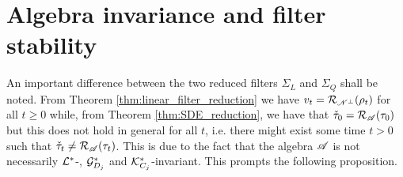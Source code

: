 \documentclass[aihp,12pt]{imsart}
\begin{document}
\section{Algebra invariance and filter stability}

An important difference between the two reduced filters $\Sigma_L$ and $\Sigma_Q$ shall be noted. From Theorem \ref{thm:linear_filter_reduction} we have $v_t = \mathcal{R}_{\mathscr{N}^\perp}(\rho_t)$ for all $t\geq0$ while, from Theorem \ref{thm:SDE_reduction}, we have that $\check{\tau}_0 = \mathcal{R}_{\mathscr{A}}(\tau_0)$ but this does not hold in general for all $t$, i.e. there might exist some time $t>0$ such that $\check{\tau}_t \neq \mathcal{R}_{\mathscr{A}}(\tau_t)$. This is due to the fact that the algebra $\mathscr{A}$ is not necessarily $\mathcal{L}^*$-, $\mathcal{G}_{D_j}^*$ and $\mathcal{K}_{C_j}^*$-invariant. This prompts the following proposition.
\end{document}
